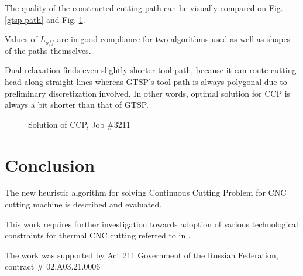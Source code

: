 \documentclass{ifacconf}
\begin{document}
The quality of the constructed
cutting path can be visually compared
on Fig. \ref{gtsp-path} and Fig. \ref{ccp-path}.

Values of $L_{off}$ are in good compliance for two algorithms used
as well as shapes of the paths themselves.

Dual relaxation finds even slightly shorter tool path,
because it can route cutting head along straight lines
whereas GTSP's tool path is always polygonal
due to preliminary discretization involved.
In other words,
optimal solution for CCP is always a bit shorter
than that of GTSP.

\begin{figure}
  \caption{Solution of CCP, Job \#3211}
  \label{ccp-path}
\end{figure}

\section{Conclusion}

The new heuristic algorithm
for solving
Continuous Cutting Problem
for CNC cutting machine
is described and evaluated.

This work requires
further investigation
towards adoption of
various technological constraints
for thermal CNC cutting
referred to in
\cite{Petunin2016Dec}.

\begin{ack}
The work was supported by Act 211 Government of the Russian Federation,
contract \# 02.A03.21.0006
\end{ack}

\end{document}
